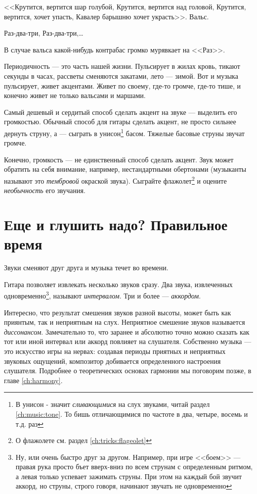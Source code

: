 <<Крутится, вертится шар голубой, Крутится, вертится над головой, Крутится, вертится, хочет упасть, Кавалер барышню хочет украсть>>. Вальс. 
\begin{center}
    Раз-два-три, Раз-два-три,\ldots 
\end{center}
В случае вальса какой-нибудь контрабас громко мурявкает на <<Раз>>.

Периодичность --- это часть нашей жизни. Пульсирует в жилах кровь, тикают секунды в часах, рассветы сменяются закатами, лето --- зимой. Вот и музыка пульсирует, живет акцентами. Живет по своему, где-то громче, где-то тише, и конечно живет не только вальсами и маршами.

Самый дешевый и сердитый способ сделать акцент на звуке --- выделить его громкостью. Обычный способ для гитары сделать акцент, не просто сильнее дернуть струну, а --- сыграть в унисон\footnote{В унисон - значит \emph{сливающимися} на слух звуками, читай раздел \ref{ch:music:tone}. То бишь отличающимися по частоте в два, четыре, восемь и т.д. раз} басом. Тяжелые басовые струны звучат громче.

Конечно, громкость --- не единственный способ сделать акцент. Звук может обратить на себя внимание, например, нестандартными обертонами (музыканты называют это \emph{тембровой} окраской звука). Сыграйте флажолет\footnote{О флажолете см. раздел \ref{ch:tricks:flageolet}} и оцените \emph{необычность} его звучания.


\section{Еще и глушить надо? Правильное время}
\label{ch:music:rythm}

Звуки сменяют друг друга и музыка течет во времени. 

Гитара позволяет извлекать несколько звуков сразу. Два звука, извлеченных одновременно\footnote{Ну, или очень быстро друг за другом. Например, при игре <<боем>> --- правая рука просто бъет вверх-вниз по всем струнам с определенным ритмом, а левая только успевает зажимать струны. При этом на каждый бой звучит аккорд, но струны, строго говоря, начинают звучать не одновременно}, называют \emph{интервалом}. Три и более --- \emph{аккордом}.

Интересно, что результат смешения звуков разной высоты, может быть как приянтым, так и неприятным на слух. Неприятное смешение звуков называется \emph{диссонансом}. Замечательно то, что заранее и абсолютно точно можно сказать как тот или иной интервал или аккорд повлияет на слушателя. Собственно музыка --- это искусство игры на нервах: создавая периоды приятных и неприятных звуковых ощущений, композитор добивается определенного настроения слушателя. Подробнее о теоретических основах гармонии мы поговорим позже, в главе \ref{ch:harmony}.

